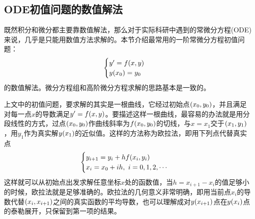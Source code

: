 \documentclass[12pt,a4paper,openany,twoside]{book}
\numberwithin{equation}{section}
\begin{document}
        \subsection{ODE初值问题的数值解法}
          既然积分和微分都主要靠数值解法，那么对于实际科研中遇到的常微分方程(ODE)来说，几乎是只能用数值方法求解的。本节介绍最常用的一阶常微分方程初值问题：
          \begin{equation*}
            \begin{cases}
              y'=f\qty(x,y)\\
              y\qty(x_0)=y_0
            \end{cases}
          \end{equation*}
          的数值解法。微分方程组和高阶微分方程求解的思路基本是一致的。

          上文中的初值问题，要求解的其实是一根曲线，它经过初始点$\qty(x_0,y_0)$，并且满足对每一点$x$的导数满足$y'=f\qty(x,y)$。要描述这样一根曲线，最容易的办法就是用分段线性的方式，过点$\qty(x_0,y_0)$作曲线斜率为$f\qty(x_0,y_0)$的切线，与$x=x_1$交于$\qty(x_1,y_1)$，用$y_1$作为真实解$y\qty(x_1)$的近似值。这样的方法称为欧拉法，即用下列点代替真实点
          \begin{equation}
            \begin{cases}
              y_{i+1}=y_i+hf\qty(x_i, y_i)\\
              x_i=x_0+ih,\ i=0,1,2,\cdots
            \end{cases}
          \end{equation}
          这样就可以从初始点出发求解任意坐标$x$处的函数值，当$h=x_{i+1}-x_i$的值足够小的时候，欧拉法就是足够准确的。欧拉法的几何意义非常明确，即用当前点$x_i$的导数代替$\qty(x_i,x_{i+1})$之间的真实函数的平均导数，也可以理解成对$y\qty(x_{i+1})$点在$y\qty(x_i)$点的泰勒展开，只保留到第一项的结果。
\end{document}
